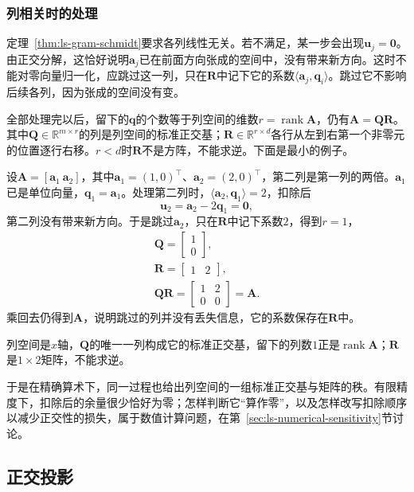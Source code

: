 \subsubsection{列相关时的处理}

定理~\ref{thm:ls-gram-schmidt}要求各列线性无关。若不满足，某一步会出现$\bm u_j=\bm0$。由正交分解，这恰好说明$\bm a_j$已在前面方向张成的空间中，没有带来新方向。这时不能对零向量归一化，应跳过这一列，只在$\bm R$中记下它的系数$\langle\bm a_j,\bm q_i\rangle$。跳过它不影响后续各列，因为张成的空间没有变。

全部处理完以后，留下的$\bm q$的个数等于列空间的维数$r=\operatorname{rank}\bm A$，仍有$\bm A=\bm Q\bm R$。其中$\bm Q\in\mathbb R^{m\times r}$的列是列空间的标准正交基；$\bm R\in\mathbb R^{r\times d}$各行从左到右第一个非零元的位置逐行右移。$r<d$时$\bm R$不是方阵，不能求逆。下面是最小的例子。
\begin{example}[列相关时跳过零余量]
\label{ex:ls-qr-dependent-columns}
设$\bm A=[\bm a_1\ \bm a_2]$，其中$\bm a_1=(1,0)^\top$、$\bm a_2=(2,0)^\top$，第二列是第一列的两倍。$\bm a_1$已是单位向量，$\bm q_1=\bm a_1$。处理第二列时，$\langle\bm a_2,\bm q_1\rangle=2$，扣除后
\[
 \bm u_2=\bm a_2-2\bm q_1=\bm0,
\]
第二列没有带来新方向。于是跳过$\bm a_2$，只在$\bm R$中记下系数$2$，得到$r=1$，
\[
\begin{gathered}
\bm Q=\begin{bmatrix}1\\0\end{bmatrix},\\
\bm R=\begin{bmatrix}1&2\end{bmatrix},\\
\bm Q\bm R=\begin{bmatrix}1&2\\0&0\end{bmatrix}=\bm A .
\end{gathered}
\]
乘回去仍得到$\bm A$，说明跳过的列并没有丢失信息，它的系数保存在$\bm R$中。

列空间是$x$轴，$\bm Q$的唯一一列构成它的标准正交基，留下的列数$1$正是$\operatorname{rank}\bm A$；$\bm R$是$1\times2$矩阵，不能求逆。
\end{example}
于是在精确算术下，同一过程也给出列空间的一组标准正交基与矩阵的秩。有限精度下，扣除后的余量很少恰好为零；怎样判断它“算作零”，以及怎样改写扣除顺序以减少正交性的损失，属于数值计算问题，在第~\ref{sec:ls-numerical-sensitivity}节讨论。

\subsection{正交投影}
\label{sec:ls-orthogonal-projection}

